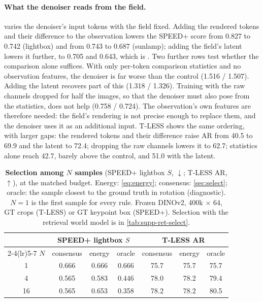 \paragraph{What the denoiser reads from the field.}
 varies the denoiser's input tokens with the field fixed. Adding the rendered tokens and their difference to the
observation lowers the SPEED+ score from 0.827 to 0.742 (lightbox) and from 0.743 to 0.687 (sunlamp); adding the field's latent lowers
it further, to 0.705 and 0.643, which is \method. Two further rows test whether the comparison alone suffices.
With only per-token comparison statistics and no observation features, the denoiser is far worse than the control (1.516 / 1.507).
Adding the latent recovers part of this (1.318 / 1.326). Training with the raw channels dropped for half the images, so that the
denoiser must also pose from the statistics, does not help (0.758 / 0.724). The observation's own features are therefore needed: the
field's rendering is not precise enough to replace them, and the denoiser uses it as an additional input.
T-LESS shows the same ordering, with larger gaps: the rendered tokens and their difference raise AR from 40.5 to 69.9 and the latent
to 72.4; dropping the raw channels lowers it to 62.7; statistics alone reach 42.7, barely above the control, and 51.0 with the latent.

\begin{table}[t]
\centering
\caption{\textbf{Selection among $N$ samples} (SPEED+ lightbox $S$, $\downarrow$; T-LESS AR, $\uparrow$), \method at the matched budget.
Energy: \cref{eq:energy}; consensus: \cref{sec:select}; oracle: the sample closest to the ground truth in rotation (diagnostic).
$N=1$ is the first sample for every rule. Frozen DINOv2, 400k $\times$ 64, GT crops (T-LESS) or GT keypoint box (SPEED+). Selection
with the retrieval world model is in \cref{tab:supp-ret-select}.}
\label{tab:select}
\small
\setlength{\tabcolsep}{3.5pt}
\begin{tabular}{@{}c ccc ccc@{}}
\toprule
& \multicolumn{3}{c}{SPEED+ lightbox $S$} & \multicolumn{3}{c}{T-LESS AR} \\
\cmidrule(lr){2-4}\cmidrule(lr){5-7}
$N$ & consensus & energy & \color{gray}oracle & consensus & energy & \color{gray}oracle \\
\midrule
1  & 0.666 & 0.666 & \color{gray}0.666 & 75.7 & 75.7 & \color{gray}75.7 \\ %
4  & 0.565 & 0.583 & \color{gray}0.446 & 78.0 & 78.2 & \color{gray}79.4 \\
16 & 0.565 & 0.653 & \color{gray}0.358 & 78.2 & 78.2 & \color{gray}80.5 \\
\bottomrule
\end{tabular}
\end{table}

